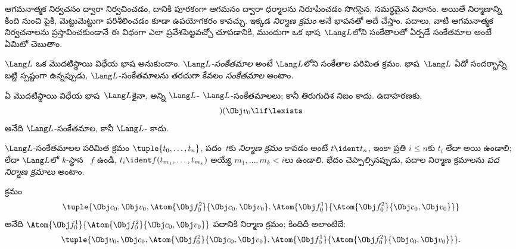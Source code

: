 \documentclass[../../../include/open-logic-section]{subfiles}
\begin{document}


ఆగమనాత్మక నిర్వచనం ద్వారా  నిర్వచించడం, దానికి పూరకంగా
ఆగమనం ద్వారా  ధర్మాలను నిరూపించడం సొగసైన, సమర్థమైన
విధానం. అయితే  నిర్మాణాన్ని కింది నుంచి పైకి, మెట్టుమెట్టుగా
పరిశీలించడం కూడా ఉపయోగకరం కావచ్చు. ఇక్కడ \emph{నిర్మాణ క్రమం} అనే
భావనతో అదే చేస్తాం.
%
పదాలు,  వాటి ఆగమనాత్మక నిర్వచనాలను ప్రస్తావించకుండానే
ఈ విధంగా ఎలా ప్రవేశపెట్టవచ్చో చూపడానికి, ముందుగా ఒక భాష~$\Lang L$లోని
సంకేతాలతో ఏర్పడే సంకేతమాల అంటే ఏమిటో చెబుతాం.

\begin{defn}[సంకేతమాలలు]
$\Lang L$ ఒక మొదటిస్థాయి విధేయ భాష అనుకుందాం. \emph{$\Lang
L$-సంకేతమాల} అంటే $\Lang L$లోని సంకేతాల పరిమిత క్రమం. భాష~$\Lang L$
ఏదో సందర్భాన్ని బట్టి స్పష్టంగా ఉన్నప్పుడు, $\Lang L$-సంకేతమాలను తరచుగా
కేవలం \emph{సంకేతమాల} అంటాం.
\end{defn}

\begin{ex}
ఏ మొదటిస్థాయి విధేయ భాష~$\Lang L$కైనా, అన్ని $\Lang L$-
$\Lang L$-సంకేతమాలలు; కానీ తిరుగుదిశ నిజం కాదు. ఉదాహరణకు,
\[)(\Obj v_0\lif\lexists\] అనేది $\Lang L$-సంకేతమాల, కానీ
$\Lang L$- కాదు.
\end{ex}

\begin{defn}[పదాల నిర్మాణ క్రమాలు]
$\Lang L$-సంకేతమాలల పరిమిత క్రమం $\tuple{t_0,\dotsc,t_n}$, పదం~$t$కు
\emph{నిర్మాణ క్రమం} కావడం అంటే $t \ident t_n$, ఇంకా ప్రతి $i \leq n$కు
$t_i$  లేదా  అయి ఉండాలి; లేదా $\Lang L$లో
$k$-స్థాన ~$f$ ఉండి, $t_i \ident
f(t_{m_1},\dotsc,t_{m_k})$ అయ్యే $m_1,\dotsc,m_k < i$లు ఉండాలి.
భేదం చెప్పాల్సినప్పుడు, పదాల నిర్మాణ క్రమాలను \emph{పద నిర్మాణ
క్రమాలు} అంటాం.
\end{defn}

\begin{ex}
క్రమం
\[
    \tuple{\Obj c_0, \Obj v_0, \Atom{\Obj f^2_0}{\Obj c_0, \Obj v_0}, \Atom{\Obj f^1_0}{\Atom{\Obj f^2_0}{\Obj c_0, \Obj v_0}}}
\]
అనేది $\Atom{\Obj f^1_0}{\Atom{\Obj
f^2_0}{\Obj c_0, \Obj v_0}}$ పదానికి నిర్మాణ క్రమం; కిందిదీ అలాంటిదే:
\[
    \tuple{\Obj v_0, \Obj c_0, \Atom{\Obj f^2_0}{\Obj c_0, \Obj v_0}, \Atom{\Obj f^1_0}{\Atom{\Obj f^2_0}{\Obj c_0, \Obj v_0}}}.
\]
\end{ex}
\end{document}

